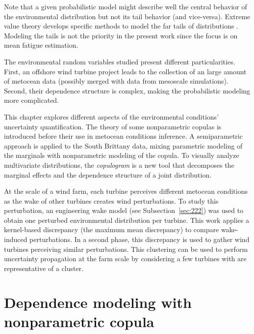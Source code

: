 Note that a given probabilistic model might describe well the central behavior of the environmental distribution but not its tail behavior (and vice-versa).   
Extreme value theory develops specific methods to model the far tails of distributions \citep{beirlant_2006_extreme_values}. 
Modeling the tails is not the priority in the present work since the focus is on mean fatigue estimation.   

The environmental random variables studied present different particularities. 
First, an offshore wind turbine project leads to the collection of an large amount of metocean data (possibly merged with data from mesoscale simulations). 
Second, their dependence structure is complex, making the probabilistic modeling more complicated. 

This chapter explores different aspects of the environmental conditions' uncertainty quantification. 
The theory of some nonparametric copulas is introduced before their use in metocean conditions inference. 
A semiparametric approach is applied to the South Brittany data, mixing parametric modeling of the marginals with nonparametric modeling of the copula. 
To visually analyze multivariate distributions, the \textit{copulogram} is a new tool that decomposes the marginal effects and the dependence structure of a joint distribution. 

At the scale of a wind farm, each turbine perceives different metocean conditions as the wake of other turbines creates wind perturbations. 
To study this perturbation, an engineering wake model (see Subsection~\ref{sec:222}) was used to obtain one perturbed environmental distribution per turbine. 
This work applies a kernel-based discrepancy (the maximum mean discrepancy) to compare wake-induced perturbations. 
In a second phase, this discrepancy is used to gather wind turbines perceiving similar perturbations. 
This clustering can be used to perform uncertainty propagation at the farm scale by considering a few turbines with are representative of a cluster. 


\section{Dependence modeling with nonparametric copula}\label{sec:nonparametric_copula}

